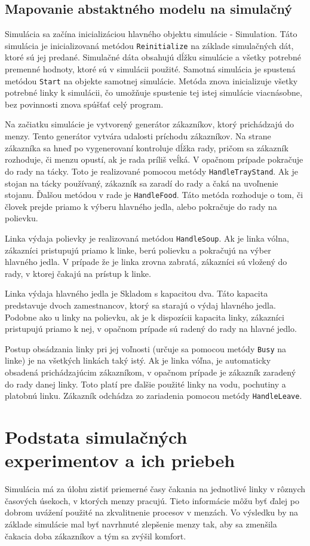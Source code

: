 \documentclass{article}
\begin{document}
\subsection{Mapovanie abstaktného modelu na simulačný}
Simulácia sa začína inicializáciou hlavného objektu simulácie - Simulation. Táto simulácia je inicializovaná metódou \texttt{Reinitialize} na základe simulačných dát, ktoré sú jej predané. Simulačné dáta obsahujú dĺžku simulácie a všetky potrebné premenné hodnoty, ktoré sú v simulácii použité. Samotná simulácia je spustená metódou \texttt{Start} na objekte samotnej simulácie. Metóda znova inicializuje všetky potrebné linky k simulácii, čo umožňuje spustenie tej istej simulácie viacnásobne, bez povinnosti znova spúšťať celý program.

Na začiatku simulácie je vytvorený generátor zákazníkov, ktorý prichádzajú do menzy. Tento generátor vytvára udalosti príchodu zákazníkov. Na strane zákazníka sa hneď po vygenerovaní kontroluje dĺžka rady, pričom sa zákazník rozhoduje, či menzu opustí, ak je rada príliš veĺká. V opačnom prípade pokračuje do rady na tácky. Toto je realizované pomocou metódy \texttt{HandleTrayStand}. Ak je stojan na tácky používaný, zákazník sa zaradí do rady a čaká na uvoľnenie stojanu. Ďalšou metódou v rade je \texttt{HandleFood}. Táto metóda rozhoduje o tom, či človek prejde priamo k výberu hlavného jedla, alebo pokračuje do rady na polievku.

Linka výdaja polievky je realizovaná metódou \texttt{HandleSoup}. Ak je linka vólna, zákazníci pristupujú priamo k linke, berú polievku a pokračujú na výber hlavného jedla. V prípade že je linka zrovna zabratá, zákazníci sú vložený do rady, v ktorej čakajú na prístup k linke.

Linka výdaja hlavného jedla je Skladom s kapacitou dva. Táto kapacita predstavuje dvoch zamestnancov, ktorý sa starajú o výdaj hlavného jedla. Podobne ako u linky na polievku, ak je k dispozícii kapacita linky, zákazníci pristupujú priamo k nej, v opačnom prípade sú radený do rady na hlavné jedlo.

Postup obsádzania linky pri jej voľnosti (určuje sa pomocou metódy \texttt{Busy} na linke) je na všetkých linkách taký istý. Ak je linka vóľna, je automaticky obsadená prichádzajúcim zákazníkom, v opačnom prípade je zákazník zaradený do rady danej linky. Toto platí pre ďalšie použité linky na vodu, pochutiny a platobnú linku. Zákazník odchádza zo zariadenia pomocou metódy \texttt{HandleLeave}.

\section{Podstata simulačných experimentov a ich priebeh}
Simulácia má za úlohu zistiť priemerné časy čakania na jednotlivé linky v rôznych časových úsekoch, v ktorých menzy pracujú. Tieto informácie môžu byť ďalej po dobrom uvážení použité na zkvalitnenie procesov v menzách. Vo výsledku by na základe simulácie mal byť navrhnuté zlepšenie menzy tak, aby sa zmenšila čakacia doba zákazníkov a tým sa zvýšil komfort.
\end{document}

